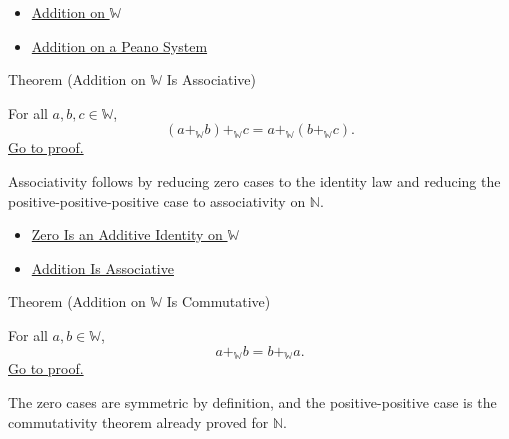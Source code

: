 \begin{dependencies}
\begin{itemize}
  \item \hyperref[def:addition-on-w]{Addition on $\mathbb{W}$}
  \item \hyperref[def:addition-on-peano-system]{Addition on a Peano System}
\end{itemize}
\end{dependencies}

\begin{theorembox}{Theorem (Addition on \texorpdfstring{$\mathbb{W}$}{W} Is Associative)}
\begin{theorem}
\label{thm:addition-on-w-associative}
For all $a,b,c\in\mathbb{W}$,
\[
(a+_{\mathbb{W}}b)+_{\mathbb{W}}c
=
a+_{\mathbb{W}}(b+_{\mathbb{W}}c).
\]
\hyperref[prf:addition-on-w-associative]{Go to proof.}
\end{theorem}
\end{theorembox}

\begin{remark*}[Interpretation]
Associativity follows by reducing zero cases to the identity law and reducing
the positive-positive-positive case to associativity on $\mathbb{N}$.
\end{remark*}

\begin{dependencies}
\begin{itemize}
  \item \hyperref[thm:zero-additive-identity-on-w]{Zero Is an Additive Identity on $\mathbb{W}$}
  \item \hyperref[thm:addition-associative]{Addition Is Associative}
\end{itemize}
\end{dependencies}

\begin{theorembox}{Theorem (Addition on \texorpdfstring{$\mathbb{W}$}{W} Is Commutative)}
\begin{theorem}
\label{thm:addition-on-w-commutative}
For all $a,b\in\mathbb{W}$,
\[
a+_{\mathbb{W}}b=b+_{\mathbb{W}}a.
\]
\hyperref[prf:addition-on-w-commutative]{Go to proof.}
\end{theorem}
\end{theorembox}

\begin{remark*}[Interpretation]
The zero cases are symmetric by definition, and the positive-positive case is
the commutativity theorem already proved for $\mathbb{N}$.
\end{remark*}

